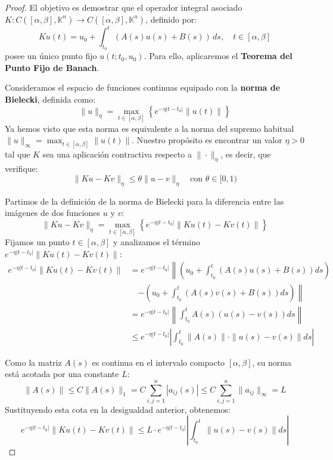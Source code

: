\begin{proof}    
    El objetivo es demostrar que el operador integral asociado $K: C([\alpha, \beta], \mathbb{K}^n) \to C([\alpha, \beta], \mathbb{K}^n)$, definido por:
    \[
    K u(t) = u_0 + \int_{t_0}^t (A(s)u(s) + B(s)) \, ds, \quad t \in [\alpha, \beta]
    \]
    posee un único punto fijo $u(t; t_0, u_0)$. Para ello, aplicaremos el \textbf{Teorema del Punto Fijo de Banach}.
    
    Consideramos el espacio de funciones continuas equipado con la \textbf{norma de Bielecki}, definida como:
    \[
    \|u\|_\eta = \max_{t \in [\alpha, \beta]} \left\{ e^{-\eta |t - t_0|} \|u(t)\| \right\}
    \]
    Ya hemos visto que esta norma es equivalente a la norma del supremo habitual $\|u\|_\infty = \max_{t \in [\alpha, \beta]} \|u(t)\|$. Nuestro propósito es encontrar un valor $\eta > 0$ tal que $K$ sea una aplicación contractiva respecto a $\|\cdot\|_\eta$, es decir, que verifique:
    \[
    \|Ku - Kv\|_\eta \le \theta \|u - v\|_\eta \quad \text{con } \theta \in [0, 1)
    \]
    
    Partimos de la definición de la norma de Bielecki para la diferencia entre las imágenes de dos funciones $u$ y $v$:
    \[
    \|Ku - Kv\|_\eta = \max_{t \in [\alpha, \beta]} \left\{ e^{-\eta |t - t_0|} \|Ku(t) - Kv(t)\| \right\}
    \]
    Fijamos un punto $t \in [\alpha, \beta]$ y analizamos el término $e^{-\eta |t - t_0|} \|Ku(t) - Kv(t)\|$:
    \begin{align*}
    e^{-\eta |t - t_0|} \|Ku(t) - Kv(t)\| &= e^{-\eta |t - t_0|} \left\| \left( u_0 + \int_{t_0}^t (A(s)u(s) + B(s)) ds \right) \right. \\
    &\quad \left. - \left( u_0 + \int_{t_0}^t (A(s)v(s) + B(s)) ds \right) \right\| \\
    &= e^{-\eta |t - t_0|} \left\| \int_{t_0}^t A(s)(u(s) - v(s)) ds \right\| \\
    &\le e^{-\eta |t - t_0|} \left| \int_{t_0}^t \|A(s)\| \cdot \|u(s) - v(s)\| ds \right|
    \end{align*}
    
    Como la matriz $A(s)$ es continua en el intervalo compacto $[\alpha, \beta]$, su norma está acotada por una constante $L$:
    \[
    \|A(s)\| \le C \|A(s)\|_1 = C \sum_{i,j=1}^n |a_{ij}(s)| \le C \sum_{i,j=1}^n \|a_{ij}\|_\infty = L
    \]
    Sustituyendo esta cota en la desigualdad anterior, obtenemos:
    \[
    e^{-\eta |t - t_0|} \|Ku(t) - Kv(t)\| \le L \cdot e^{-\eta |t - t_0|} \left| \int_{t_0}^t \|u(s) - v(s)\| ds \right|
    \]
    

\end{proof}
